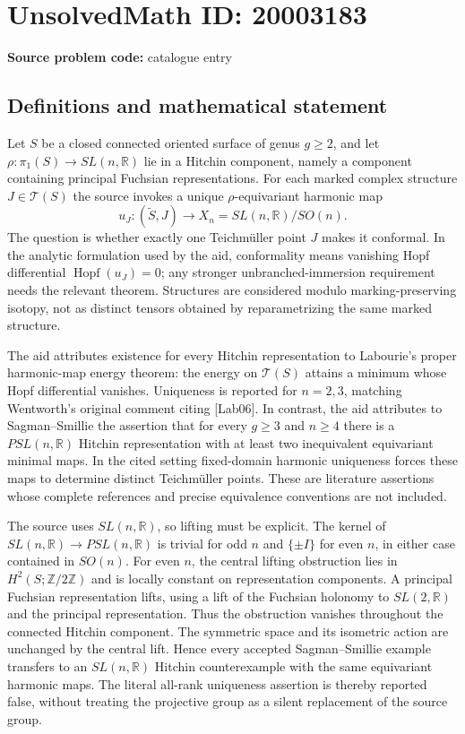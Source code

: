 \documentclass[11pt]{article}
\newcommand{\Z}{\mathbb{Z}}
\newcommand{\R}{\mathbb{R}}
\begin{document}
\section*{UnsolvedMath ID: 20003183}
\textbf{Source problem code:} catalogue entry
\subsection{Definitions and mathematical statement}
Let $S$ be a closed connected oriented surface of genus $g\geq2$, and let $\rho:\pi_1(S)\to SL(n,\R)$ lie in a Hitchin component, namely a component containing principal Fuchsian representations. For each marked complex structure $J\in\mathcal T(S)$ the source invokes a unique $\rho$-equivariant harmonic map
\[
u_J:(\widetilde S,J)\longrightarrow X_n=SL(n,\R)/SO(n).
\]
The question is whether exactly one Teichm\"uller point $J$ makes it conformal. In the analytic formulation used by the aid, conformality means vanishing Hopf differential $\operatorname{Hopf}(u_J)=0$; any stronger unbranched-immersion requirement needs the relevant theorem. Structures are considered modulo marking-preserving isotopy, not as distinct tensors obtained by reparametrizing the same marked structure.

The aid attributes existence for every Hitchin representation to Labourie's proper harmonic-map energy theorem: the energy on $\mathcal T(S)$ attains a minimum whose Hopf differential vanishes. Uniqueness is reported for $n=2,3$, matching Wentworth's original comment citing [Lab06]. In contrast, the aid attributes to Sagman--Smillie the assertion that for every $g\geq3$ and $n\geq4$ there is a $PSL(n,\R)$ Hitchin representation with at least two inequivalent equivariant minimal maps. In the cited setting fixed-domain harmonic uniqueness forces these maps to determine distinct Teichm\"uller points. These are literature assertions whose complete references and precise equivalence conventions are not included.

The source uses $SL(n,\R)$, so lifting must be explicit. The kernel of $SL(n,\R)\to PSL(n,\R)$ is trivial for odd $n$ and $\{\pm I\}$ for even $n$, in either case contained in $SO(n)$. For even $n$, the central lifting obstruction lies in $H^2(S;\Z/2\Z)$ and is locally constant on representation components. A principal Fuchsian representation lifts, using a lift of the Fuchsian holonomy to $SL(2,\R)$ and the principal representation. Thus the obstruction vanishes throughout the connected Hitchin component. The symmetric space and its isometric action are unchanged by the central lift. Hence every accepted Sagman--Smillie example transfers to an $SL(n,\R)$ Hitchin counterexample with the same equivariant harmonic maps. The literal all-rank uniqueness assertion is thereby reported false, without treating the projective group as a silent replacement of the source group.
\end{document}
